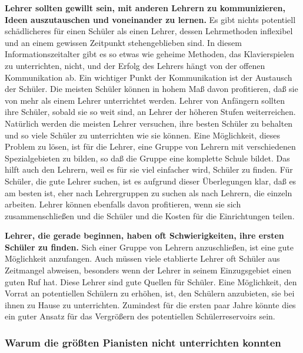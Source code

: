 \textbf{Lehrer sollten gewillt sein, mit anderen Lehrern zu kommunizieren, Ideen auszutauschen und voneinander zu lernen.}
Es gibt nichts potentiell schädlicheres für einen Schüler als einen Lehrer, dessen Lehrmethoden inflexibel und an einem gewissen Zeitpunkt stehengeblieben sind.
In diesem Informationszeitalter gibt es so etwas wie geheime Methoden, das Klavierspielen zu unterrichten, nicht, und der Erfolg des Lehrers hängt von der offenen Kommunikation ab.
Ein wichtiger Punkt der Kommunikation ist der Austausch der Schüler.
Die meisten Schüler können in hohem Maß davon profitieren, daß sie von mehr als einem Lehrer unterrichtet werden.
Lehrer von Anfängern sollten ihre Schüler, sobald sie so weit sind, an Lehrer der höheren Stufen weiterreichen.
Natürlich werden die meisten Lehrer versuchen, ihre besten Schüler zu behalten und so viele Schüler zu unterrichten wie sie können.
Eine Möglichkeit, dieses Problem zu lösen, ist für die Lehrer, eine Gruppe von Lehrern mit verschiedenen Spezialgebieten zu bilden, so daß die Gruppe eine komplette Schule bildet.
Das hilft auch den Lehrern, weil es für sie viel einfacher wird, Schüler zu finden.
Für Schüler, die gute Lehrer suchen, ist es aufgrund dieser Überlegungen klar, daß es am besten ist, eher nach Lehrergruppen zu suchen als nach Lehrern, die einzeln arbeiten.
Lehrer können ebenfalls davon profitieren, wenn sie sich zusammenschließen und die Schüler und die Kosten für die Einrichtungen teilen.

\textbf{Lehrer, die gerade beginnen, haben oft Schwierigkeiten, ihre ersten Schüler zu finden.}
Sich einer Gruppe von Lehrern anzuschließen, ist eine gute Möglichkeit anzufangen.
Auch müssen viele etablierte Lehrer oft Schüler aus Zeitmangel abweisen, besonders wenn der Lehrer in seinem Einzugsgebiet einen guten Ruf hat.
Diese Lehrer sind gute Quellen für Schüler.
Eine Möglichkeit, den Vorrat an potentiellen Schülern zu erhöhen, ist, den Schülern anzubieten, sie bei ihnen zu Hause zu unterrichten.
Zumindest für die ersten paar Jahre könnte dies ein guter Ansatz für das Vergrößern des potentiellen Schülerreservoirs sein.


\subsubsection{Warum die größten Pianisten nicht unterrichten konnten}
\label{c1iii16e}

